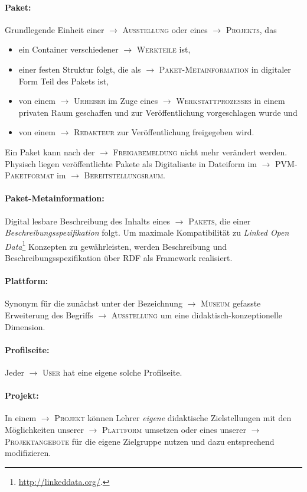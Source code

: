 \documentclass[a4paper,11pt]{article}
\newcommand{\glossar}[1]{{$\to$ \textsc{#1}}}
\begin{document}
\paragraph{Paket:} 
Grundlegende Einheit einer \glossar{Ausstellung} oder eines \glossar{Projekts},
das
\begin{itemize}\itemsep0pt
\item ein Container verschiedener \glossar{Werkteile} ist,
\item einer festen Struktur folgt, die als \glossar{Paket-Metainformation} in
  digitaler Form Teil des Pakets ist,  
\item von einem \glossar{Urheber} im Zuge eines \glossar{Werkstattprozesses}
  in einem privaten Raum geschaffen und zur Veröffentlichung vorgeschlagen
  wurde und
\item von einem \glossar{Redakteur} zur Veröffentlichung freigegeben wird.
\end{itemize}
Ein Paket kann nach der \glossar{Freigabemeldung} nicht mehr verändert werden.
Physisch liegen veröffentlichte Pakete als Digitalisate in Dateiform im
\glossar{PVM-Paketformat} im \glossar{Bereitstellungsraum}.

\paragraph{Paket-Metainformation:}
Digital lesbare Beschreibung des Inhalts eines \glossar{Pakets}, die einer
\emph{Beschreibungsspezifikation} folgt.  Um maximale Kompatibilität zu
\emph{Linked Open Data}\footnote{\url{http://linkeddata.org/}.} Konzepten zu
gewährleisten, werden Beschreibung und Beschreibungsspezifikation über RDF als
Framework realisiert.

\paragraph{Plattform:} 
Synonym für die zunächst unter der Bezeichnung \glossar{Museum} gefasste
Erweiterung des Begriffs \glossar{Ausstellung} um eine
didaktisch-konzeptionelle Dimension. 

\paragraph{Profilseite:} 
Jeder \glossar{User} hat eine eigene solche Profilseite.  

\paragraph{Projekt:} 
In einem \glossar{Projekt} können Lehrer \emph{eigene} didaktische
Zielstellungen mit den Möglichkeiten unserer \glossar{Plattform} umsetzen oder
eines unserer \glossar{Projektangebote} für die eigene Zielgruppe nutzen und
dazu entsprechend modifizieren.
\end{document}
